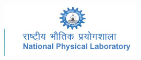 \begin{titlepage}
	\begin{addmargin}[-1cm]{-3cm}
    \begin{center}
        \large  

        \hfill

        \vfill

        \begingroup
            \color{Maroon}\spacedallcaps{\myTitle} \\ \bigskip
        \endgroup

        \spacedlowsmallcaps{\myName}

        \vfill

        \includegraphics[width=7cm]{gfx/snapshot3} \\ \medskip

        \mySubtitle \\ \medskip   
        \myProf \\
        \myUni \\ \bigskip

        \myTime\

        \vfill                      

    \end{center}  
  \end{addmargin}       
\end{titlepage}   